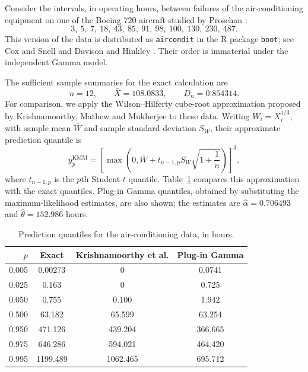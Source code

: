 \documentclass[11pt]{article}
\theoremstyle{remark}
\begin{document}
Consider the intervals, in operating hours, between failures of the air-conditioning equipment on one of the Boeing 720 aircraft studied by Proschan \cite{Proschan1963}:
\begin{equation}
 3,\ 5,\ 7,\ 18,\ 43,\ 85,\ 91,\ 98,\ 100,\ 130,\ 230,\ 487.
 \label{eq:aircond_data}
\end{equation}
This version of the data is distributed as \texttt{aircondit} in the R package \texttt{boot}; see Cox and Snell \cite{CoxSnell1981} and Davison and Hinkley \cite{DavisonHinkley1997}. Their order is immaterial under the independent Gamma model.

The sufficient sample summaries for the exact calculation are
\begin{equation}
 n=12,
 \qquad
 \bar X=108.0833,
 \qquad
 D_n=0.854314.
 \label{eq:aircond_summary}
\end{equation}
For comparison, we apply the Wilson--Hilferty cube-root approximation proposed by Krishnamoorthy, Mathew and Mukherjee \cite{Krishnamoorthy2008} to these data. Writing $W_i=X_i^{1/3}$, with sample mean $\bar W$ and sample standard deviation $S_W$, their approximate prediction quantile is
\begin{equation}
 y_p^{\mathrm{KMM}}
 =\left[\max\left(0,
 \bar W+t_{n-1,p}S_W\sqrt{1+\frac1n}\right)\right]^3,
 \label{eq:kmm_prediction}
\end{equation}
where $t_{n-1,p}$ is the $p$th Student-$t$ quantile. Table~\ref{tab:aircond} compares this approximation with the exact quantiles. Plug-in Gamma quantiles, obtained by substituting the maximum-likelihood estimates, are also shown; the estimates are $\widehat\alpha=0.706493$ and $\widehat\theta=152.986$ hours.

\begin{table}[ht]
\centering
\caption{Prediction quantiles for the air-conditioning data, in hours.}
\label{tab:aircond}
\begin{tabular}{@{}rccc@{}}
\toprule
$p$ & Exact & Krishnamoorthy et al. & Plug-in Gamma\\
\midrule
0.005 & 0.00273 & 0 & 0.0741\\
0.025 & 0.163 & 0 & 0.725\\
0.050 & 0.755 & 0.100 & 1.942\\
0.500 & 63.182 & 65.599 & 63.254\\
0.950 & 471.126 & 439.204 & 366.665\\
0.975 & 646.286 & 594.021 & 464.420\\
0.995 & 1199.489 & 1062.465 & 695.712\\
\bottomrule
\end{tabular}
\end{table}
\FloatBarrier
\end{document}
